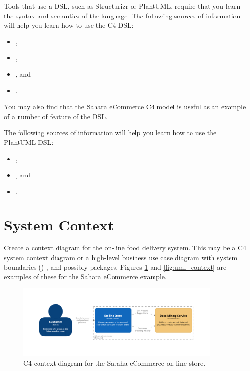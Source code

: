 \documentclass{csse4400}
\begin{document}
Tools that use a DSL, such as Structurizr or PlantUML, require that you learn the syntax and semantics of the language.
The following sources of information will help you learn how to use the C4 DSL:
\begin{itemize}[nosep]
    \item {},
    \item {}, 
    \item {}, and
    \item {}.
\end{itemize}
You may also find that the Sahara eCommerce C4 model is useful as an example of a number of feature of the DSL.

The following sources of information will help you learn how to use the PlantUML DSL:
\begin{itemize}[nosep]
    \item {},
    \item {}, and
    \item {}.
\end{itemize}


\section{System Context}
Create a context diagram for the on-line food delivery system.
This may be a C4 system context diagram or a high-level business use case diagram with system boundaries
() \cite{uml}, and possibly packages.
Figures \ref{fig:c4_context} and \ref{fig:uml_context} are examples of these for the Sahara eCommerce example.

\begin{figure}[h!]
    \centering
    \includegraphics[trim=195 195 198 195,clip,width=0.9\textwidth]{../../notes/views/images/c4/context_diagram.png}
    \caption{C4 context diagram for the Saraha eCommerce on-line store.}
    \label{fig:c4_context}
\end{figure}
\end{document}
